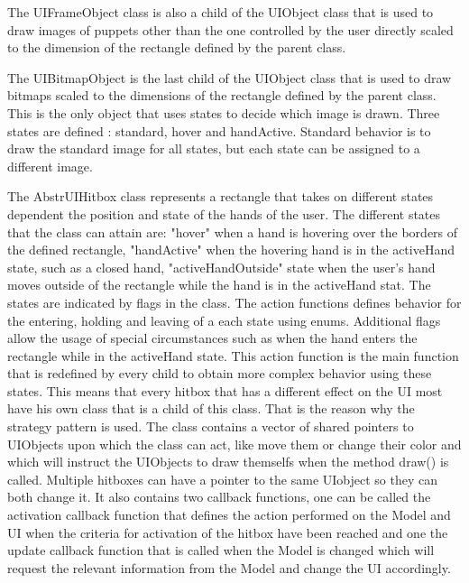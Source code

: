The UI\textunderscore FrameObject class is also a child of the UI\textunderscore Object class that is used to draw images of puppets other than the one controlled by the user directly scaled to the dimension of the rectangle defined by the parent class.

The UI\textunderscore BitmapObject is the last child of the UI\textunderscore Object class that is used to draw bitmaps scaled to the dimensions of the rectangle defined by the parent class. This is the only object that uses states to decide which image is drawn. Three states are defined : standard, hover and handActive. Standard behavior is to draw the standard image for all states, but each state can be assigned to a different image.

The Abstr\textunderscore UI\textunderscore Hitbox class represents a rectangle that takes on different states dependent the position and state of the hands of the user. The different states that the class can attain are: "hover" when a hand is hovering over the borders of the defined rectangle, "handActive" when the hovering hand is in the activeHand state, such as a closed hand, "activeHandOutside" state when the user's hand moves outside of the rectangle while the hand is in the activeHand stat. The states are indicated by flags in the class. The action functions defines behavior for the entering, holding and leaving of a each state using enums. Additional flags allow the usage of special circumstances such as when the hand enters the rectangle while in the activeHand state. This action function is the main function that is redefined by every child to obtain more complex behavior using these states. This means that every hitbox that has a different effect on the UI most have his own class that is a child of this class. That is the reason why the strategy pattern is used. The class contains a vector of shared pointers to UI\textunderscore Objects upon which the class can act, like move them or change their color and which will instruct the UI\textunderscore Objects to draw themselfs when the method draw() is called. Multiple hitboxes can have a pointer to the same UI\textunderscore object so they can both change it. It also contains two callback functions, one can be called the activation callback function that defines the action performed on the Model and UI when the criteria for activation of the hitbox have been reached and one the update callback function that is called when the Model is changed which will request the relevant information from the Model and change the UI accordingly. 

